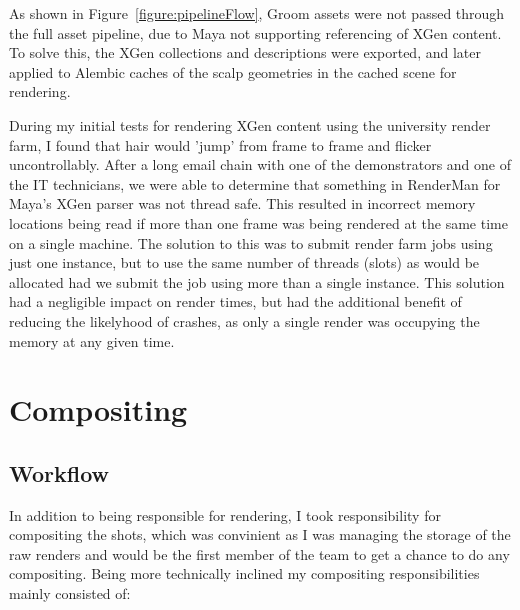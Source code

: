 \documentclass[11pt]{article}
\begin{document}
As shown in Figure~\ref{figure:pipelineFlow}, Groom assets were not passed through the full asset pipeline, due to Maya not supporting referencing of XGen content. To solve this, the XGen collections and descriptions were exported, and later applied to Alembic caches of the scalp geometries in the cached scene for rendering.

During my initial tests for rendering XGen content using the university render farm, I found that hair would 'jump' from frame to frame and flicker uncontrollably. After a long email chain with one of the demonstrators and one of the IT technicians, we were able to determine that something in RenderMan for Maya's XGen parser was not thread safe. This resulted in incorrect memory locations being read if more than one frame was being rendered at the same time on a single machine. The solution to this was to submit render farm jobs using just one instance, but to use the same number of threads (slots) as would be allocated had we submit the job using more than a single instance. This solution had a negligible impact on render times, but had the additional benefit of reducing the likelyhood of crashes, as only a single render was occupying the memory at any given time.

\section{Compositing}


\subsection{Workflow}

In addition to being responsible for rendering, I took responsibility for compositing the shots, which was convinient as I was managing the storage of the raw renders and would be the first member of the team to get a chance to do any compositing. Being more technically inclined my compositing responsibilities mainly consisted of:
\end{document}
